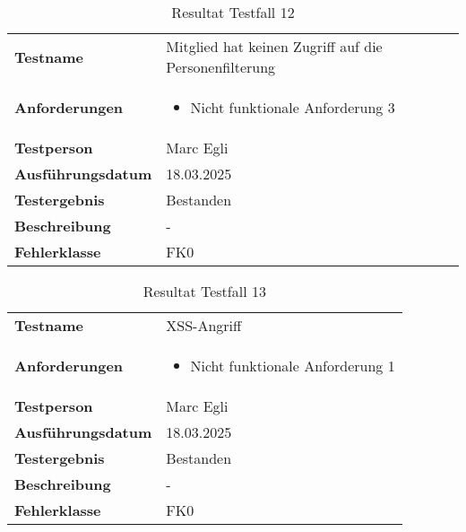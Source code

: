 \begin{table}[H]
    \begin{tabular}{|L{0.3\textwidth}|L{0.65\textwidth}|}
        \hline
           \\[10pt]
        \hline
        \textbf{Testname} & Mitglied hat keinen Zugriff auf die Personenfilterung \\
        \hline
        \textbf{Anforderungen} & 
        \begin{itemize}
            \item Nicht funktionale Anforderung 3
        \end{itemize} \\
        \hline
        \textbf{Testperson} & Marc Egli \\
        \hline
        \textbf{Ausführungsdatum} & 18.03.2025 \\
        \hline
        \textbf{Testergebnis} & Bestanden \\
        \hline
        \textbf{Beschreibung} & - \\ 
        \hline
        \textbf{Fehlerklasse} & FK0 \\ 
        \hline
    \end{tabular}
    \caption{Resultat Testfall 12}
\end{table}

\begin{table}[H]
    \begin{tabular}{|L{0.3\textwidth}|L{0.65\textwidth}|}
        \hline
           \\[10pt]
        \hline
        \textbf{Testname} & XSS-Angriff \\
        \hline
        \textbf{Anforderungen} & 
        \begin{itemize}
            \item Nicht funktionale Anforderung 1
        \end{itemize} \\
        \hline
        \textbf{Testperson} & Marc Egli \\
        \hline
        \textbf{Ausführungsdatum} & 18.03.2025 \\
        \hline
        \textbf{Testergebnis} & Bestanden \\
        \hline
        \textbf{Beschreibung} & - \\ 
        \hline
        \textbf{Fehlerklasse} & FK0 \\ 
        \hline
    \end{tabular}
    \caption{Resultat Testfall 13}
\end{table}

